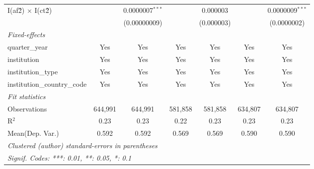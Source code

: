 \begin{tabular}{lcccccc}
   I(af\^2) $\times$ I(ct\^2)         &               & 0.0000007$^{***}$ &               & 0.000003        &               & 0.0000009$^{***}$\\   
                                      &               & (0.00000009)      &               & (0.000003)      &               & (0.0000002)\\   
   \midrule
   \emph{Fixed-effects}\\
   quarter\_year                      & Yes           & Yes               & Yes           & Yes             & Yes           & Yes\\  
   institution                        & Yes           & Yes               & Yes           & Yes             & Yes           & Yes\\  
   institution\_type                  & Yes           & Yes               & Yes           & Yes             & Yes           & Yes\\  
   institution\_country\_code         & Yes           & Yes               & Yes           & Yes             & Yes           & Yes\\  
   \midrule
   \emph{Fit statistics}\\
   Observations                       & 644,991       & 644,991           & 581,858       & 581,858         & 634,807       & 634,807\\  
   R$^2$                              & 0.23          & 0.23              & 0.22          & 0.23            & 0.23          & 0.23\\  
Mean(Dep. Var.) & 0.592 & 0.592 & 0.569 & 0.569 & 0.590 & 0.590 \\
   \midrule \midrule
   \multicolumn{7}{l}{\emph{Clustered (author) standard-errors in parentheses}}\\
   \multicolumn{7}{l}{\emph{Signif. Codes: ***: 0.01, **: 0.05, *: 0.1}}\\
\end{tabular}
\par\endgroup
